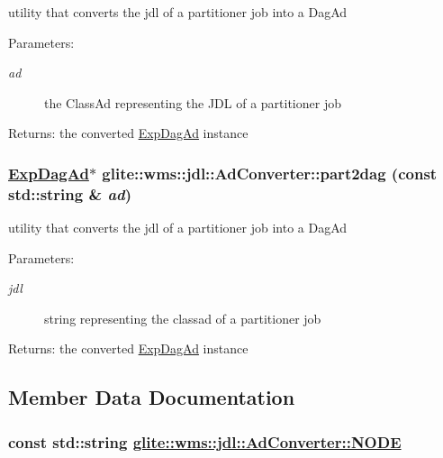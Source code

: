 utility that converts the jdl of a partitioner job into a Dag\-Ad \begin{Desc}
\item[Parameters:]
\begin{description}
\item[{\em ad}]the Class\-Ad representing the JDL of a partitioner job \end{description}
\end{Desc}
\begin{Desc}
\item[Returns:]the converted \hyperlink{classglite_1_1wms_1_1jdl_1_1ExpDagAd}{Exp\-Dag\-Ad} instance\end{Desc}
\hypertarget{classglite_1_1wms_1_1jdl_1_1AdConverter_z23_0}{
\subsubsection[part2dag]{\setlength{\rightskip}{0pt plus 5cm}\hyperlink{classglite_1_1wms_1_1jdl_1_1ExpDagAd}{Exp\-Dag\-Ad}$\ast$ glite::wms::jdl::Ad\-Converter::part2dag (const std::string \& {\em ad})}}
\label{classglite_1_1wms_1_1jdl_1_1AdConverter_z23_0}


utility that converts the jdl of a partitioner job into a Dag\-Ad \begin{Desc}
\item[Parameters:]
\begin{description}
\item[{\em jdl}]string representing the classad of a partitioner job \end{description}
\end{Desc}
\begin{Desc}
\item[Returns:]the converted \hyperlink{classglite_1_1wms_1_1jdl_1_1ExpDagAd}{Exp\-Dag\-Ad} instance\end{Desc}


\subsection{Member Data Documentation}
\hypertarget{classglite_1_1wms_1_1jdl_1_1AdConverter_s2}{
\subsubsection[NODE]{\setlength{\rightskip}{0pt plus 5cm}const std::string \hyperlink{classglite_1_1wms_1_1jdl_1_1AdConverter_s2}{glite::wms::jdl::Ad\-Converter::NODE}}}
\label{classglite_1_1wms_1_1jdl_1_1AdConverter_s2}


